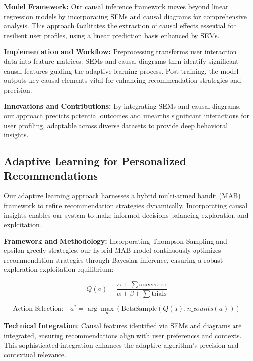 \documentclass{article} %
\begin{document}
\textbf{Model Framework:} Our causal inference framework moves beyond linear regression models by incorporating SEMs and causal diagrams for comprehensive analysis. This approach facilitates the extraction of causal effects essential for resilient user profiles, using a linear prediction basis enhanced by SEMs.

\textbf{Implementation and Workflow:} Preprocessing transforms user interaction data into feature matrices. SEMs and causal diagrams then identify significant causal features guiding the adaptive learning process. Post-training, the model outputs key causal elements vital for enhancing recommendation strategies and precision.

\textbf{Innovations and Contributions:} By integrating SEMs and causal diagrams, our approach predicts potential outcomes and unearths significant interactions for user profiling, adaptable across diverse datasets to provide deep behavioral insights.

\subsection{Adaptive Learning for Personalized Recommendations}

Our adaptive learning approach harnesses a hybrid multi-armed bandit (MAB) framework to refine recommendation strategies dynamically. Incorporating causal insights enables our system to make informed decisions balancing exploration and exploitation.

\textbf{Framework and Methodology:} Incorporating Thompson Sampling and epsilon-greedy strategies, our hybrid MAB model continuously optimizes recommendation strategies through Bayesian inference, ensuring a robust exploration-exploitation equilibrium:

\begin{equation}
Q(a) = \frac{\alpha + \sum \text{successes}}{\alpha + \beta + \sum \text{trials}}
\end{equation}

\begin{equation}
\text{Action Selection:} \quad a^* = \arg\max_{a}\left(\text{BetaSample}(Q(a), n\_counts(a))\right)
\end{equation}

\textbf{Technical Integration:} Causal features identified via SEMs and diagrams are integrated, ensuring recommendations align with user preferences and contexts. This sophisticated integration enhances the adaptive algorithm's precision and contextual relevance.
\end{document}
